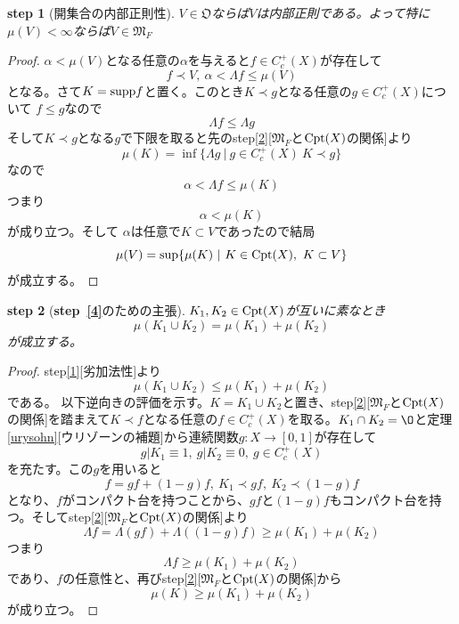 \documentclass[leqno]{jsarticle}
\newtheorem{stp}{{\bf step}}
\newcommand{\mgn}{\infty}
\newcommand{\supp}{\text{{\rm supp}}}
\newcommand{\mf}{\mathfrak{M}_F}
\newcommand{\la}{\Lambda}
\newcommand{\cpt}{{\rm Cpt}(X)}
\newcommand{\oo}{\mathfrak{O}}
\newcommand{\praf}{C_c^{+}(X)}
\newcommand{\al}{\alpha}
\begin{document}
\begin{stp}[開集合の内部正則性]\label{3}
$V\in \oo$ならば$V$は内部正則である。よって特に$\mu(V)<\mgn$ならば$V\in \mf$
\end{stp}
\begin{proof}
$\al<\mu(V)$となる任意の$\al$を与えると$f\in \praf $が存在して
\[
f\prec V,\ \al <\la f\le \mu(V)
\]
となる。さて$K=\supp f$と置く。このとき$K\prec g$となる任意の$g\in\praf$について
$f\le g$なので
\[
\la f\le \la g
\]
そして$K\prec g$となる$g$で下限を取ると先のstep\ref{2}[$\mf$と$\cpt$の関係]より
\[
\mu(K)=\inf\{\la g\ |\ g\in\praf\ K\prec g\}
\]
なので
\[
\al< \la f\le \mu(K)
\]
つまり
\[
\al<\mu(K)
\]
が成り立つ。そして
$\al$は任意で$K\subset V$であったので結局
\[
\mu(V)=\sup\{\mu(K)\ |\ K\in \cpt,\ K\subset V\}
\]
が成立する。
\end{proof}



\begin{stp}[{\bf step\ \ref{4}}のための主張]\label{kahou}
$K_1,K_2\in \cpt$が互いに素なとき
\[
\mu(K_1\cup K_2)=\mu(K_1)+\mu(K_2)
\]が成立する。
\end{stp}
\begin{proof}
step\ref{1}[劣加法性]より
\[
\mu(K_1\cup K_2)\le \mu(K_1)+\mu(K_2)
\]
である。
以下逆向きの評価を示す。$K=K_1\cup K_2$と置き、step\ref{2}[$\mf$と$\cpt$の関係]を踏まえて$K\prec f$となる任意の$f\in \praf$を取る。$K_1\cap K_2=\O$と定理\ref{urysohn}[ウリゾーンの補題]から連続関数$g:X\to [0,1]$が存在して
\[
g|K_1\equiv 1,\ g|K_2\equiv 0,\ g\in\praf 
\]
を充たす。この$g$を用いると
\[
f=gf+(1-g)f,\ K_1\prec gf,\ K_2\prec (1-g)f
\]
となり、$f$がコンパクト台を持つことから、$gf$と$(1-g)f$もコンパクト台を持つ。そしてstep\ref{2}[$\mf$と$\cpt$の関係]より
\[
\la f =\la(gf)+\la((1-g)f)\ge \mu(K_1)+\mu(K_2) 
\]
つまり
\[
\la f\ge \mu(K_1)+\mu(K_2)
\]
であり、$f$の任意性と、再びstep\ref{2}[$\mf$と$\cpt$の関係]から
\[
\mu(K)\ge \mu(K_1)+\mu(K_2)
\]
が成り立つ。
\end{proof}
\end{document}
